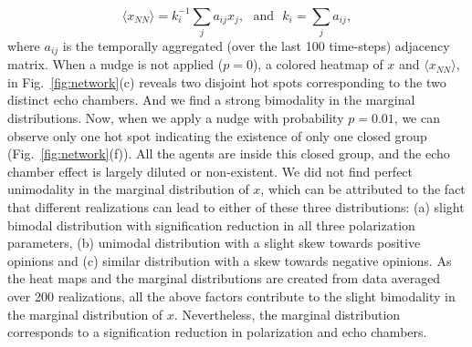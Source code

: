 \begin{equation}
\langle x_{NN}\rangle = k_i^{-1} \sum_j {a_{ij} x_j}, ~~~\mbox{and}~~~ k_i = \sum_j{a_{ij}},
\label{eq.xnn}
\end{equation}
where $a_{ij}$ is the temporally aggregated (over the last 100 time-steps) adjacency matrix. When a nudge is not applied ($p=0$), a colored heatmap of $x$ and $\langle x_{NN}\rangle$, in Fig.~\ref{fig:network}(c) reveals two disjoint hot spots corresponding to the two distinct echo chambers. And we find a strong bimodality in the marginal distributions.
Now, when we apply a nudge with probability $p=0.01$, we can observe only one hot spot indicating the existence of only one closed group (Fig.~\ref{fig:network}(f)). All the agents are inside this closed group, and the echo chamber effect is largely diluted or non-existent. We did not find perfect unimodality in the marginal distribution of $x$, which can be attributed to the fact that different realizations can lead to either of these three distributions: (a) slight bimodal distribution with signification reduction in all three polarization parameters, (b) unimodal distribution with a slight skew towards positive opinions and (c) similar distribution with a skew towards negative opinions. As the heat maps and the marginal distributions are created from data averaged over 200 realizations, all the above factors contribute to the slight bimodality in the marginal distribution of $x$. Nevertheless, the marginal distribution corresponds to a signification reduction in polarization and echo chambers.
